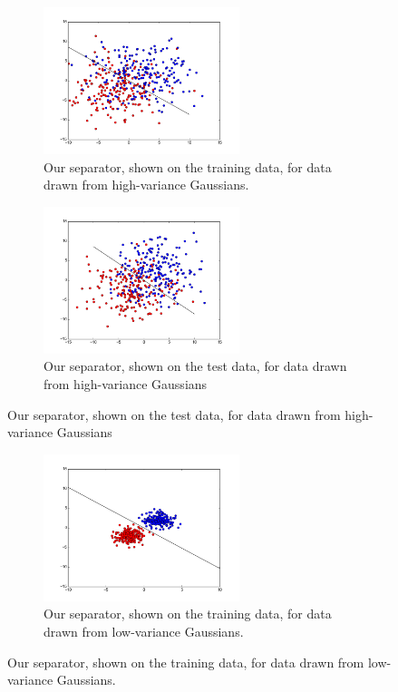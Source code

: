 \documentclass{sigchi}
\begin{document}
{\begin{figure}
\end{figure}

\begin{figure}
\centering

\begin{subfigure}[b]{2.25in}
	\includegraphics[width = 2.25in]{plots/stdev4_train_plot.png}
	\caption{Our separator, shown on the training data, for data drawn from high-variance Gaussians.}
\end{subfigure}

\begin{subfigure}[b]{2.25in}
	\includegraphics[width = 2.25in]{plots/stdev4_test_plot.png}
	\caption{Our separator, shown on the test data, for data drawn from high-variance Gaussians}
\end{subfigure}

\end{figure}

\begin{figure}
\centering

\begin{subfigure}[b]{2.25in}
	\includegraphics[width = 2.25in]{plots/stdev1_train_plot.png}
	\caption{Our separator, shown on the training data, for data drawn from low-variance Gaussians.}
\end{subfigure}


\end{figure}}
\end{document}
